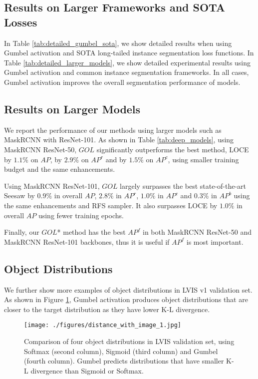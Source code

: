 \documentclass[runningheads]{llncs}
\begin{document}
\subsection{Results on Larger Frameworks and SOTA Losses}
In Table \ref{tab:detailed_gumbel_sota}, we show detailed results when using Gumbel activation and SOTA long-tailed instance segmentation loss functions. In Table \ref{tab:detailed_larger_models}, we show detailed experimental results using Gumbel activation and common instance segmentation frameworks. In all cases, Gumbel activation improves the overall segmentation performance of models.



\subsection{Results on Larger Models}
We report the performance of our methods using larger models such as MaskRCNN with ResNet-101. As shown in Table \ref{tab:deep_models}, using MaskRCNN ResNet-50, $GOL$ significantly outperforms the best method, LOCE \cite{feng2021exploring} by $1.1\%$ on $AP$, by $2.9\%$ on $AP^r$ and by $1.5\%$ on $AP^c$, using smaller training budget and the same enhancements.

Using MaskRCNN ResNet-101, $GOL$ largely surpasses the best state-of-the-art Seesaw \cite{wang2021seesaw} by $0.9\%$ in overall $AP$, $2.8\%$ in $AP^r$, $1.0\%$ in $AP^c$ and $0.3\%$ in $AP^b$ using the same enhancements and RFS sampler. It also surpasses LOCE by $1.0\%$ in overall $AP$ using fewer training epochs.

Finally, our $GOL$* method has the best $AP^f$ in both MaskRCNN ResNet-50 and MaskRCNN ResNet-101 backbones, thus it is useful if $AP^f$ is most important.


\subsection{Object Distributions}
We further show more examples of object distributions in LVIS v1 validation set. As shown in Figure \ref{fig:distance_4}, Gumbel activation produces object distributions that are closer to the target distribution as they have lower K-L divergence.

\begin{figure}[t]
    \centering
    \texttt{[image: ./figures/distance\_with\_image\_1.jpg]}
    \caption{Comparison of four object distributions in LVIS validation set, using Softmax (second column), Sigmoid (third column) and Gumbel (fourth column). Gumbel predicts distributions that have smaller K-L divergence than Sigmoid or Softmax.}
    \label{fig:distance_4}
\end{figure}
\end{document}
